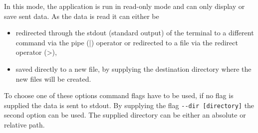 In this mode, the application is run in read-only mode and can only display or save sent data. As the data is read it can either be
\begin{itemize}
  \item redirected through the stdout (standard output) of the terminal to a different command via the pipe (|) operator or redirected to a file via the redirect operator (>),
  \item saved directly to a new file, by supplying the destination directory where the new files will be created.
\end{itemize}
To choose one of these options command flags have to be used, if no flag is supplied the data is sent to stdout. By supplying the flag \texttt{-\--dir [directory]} the second option can be used. The supplied directory can be either an absolute or relative path.
